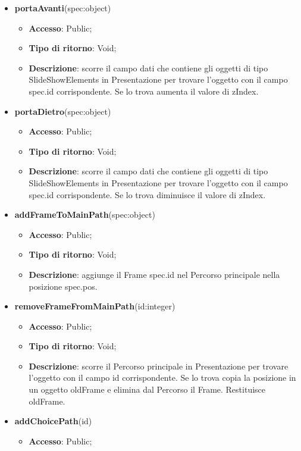 {\begin{itemize}
			\item \textbf{portaAvanti}(spec:object)
			\begin{itemize}
				\item \textbf{Accesso}: Public;
				\item \textbf{Tipo di ritorno}: Void;
				\item \textbf{Descrizione}: scorre il campo dati che contiene gli oggetti di tipo SlideShowElements in Presentazione per trovare l’oggetto con il campo spec.id corrispondente. Se lo trova aumenta il valore di zIndex.
			\end{itemize}
			\item \textbf{portaDietro}(spec:object)
			\begin{itemize}
				\item \textbf{Accesso}: Public;
				\item \textbf{Tipo di ritorno}: Void;
				\item \textbf{Descrizione}: scorre il campo dati che contiene gli oggetti di tipo SlideShowElements in Presentazione per trovare l’oggetto con il campo spec.id corrispondente. Se lo trova diminuisce il valore di zIndex.
			\end{itemize}
			\item \textbf{addFrameToMainPath}(spec:object)
			\begin{itemize}
				\item \textbf{Accesso}: Public;
				\item \textbf{Tipo di ritorno}: Void;
				\item \textbf{Descrizione}: aggiunge il Frame spec.id nel Percorso principale nella posizione spec.pos.
			\end{itemize}
			\item \textbf{removeFrameFromMainPath}(id:integer)
			\begin{itemize}
				\item \textbf{Accesso}: Public;
				\item \textbf{Tipo di ritorno}: Void;
				\item \textbf{Descrizione}: scorre il Percorso principale in Presentazione per trovare l’oggetto con il campo id corrispondente. Se lo trova copia la posizione in un oggetto oldFrame e elimina dal Percorso\ped{g} il Frame. Restituisce oldFrame.
			\end{itemize}
			\item \textbf{addChoicePath}(id)
			\begin{itemize}
				\item \textbf{Accesso}: Public;

\end{itemize}
\end{itemize}}

